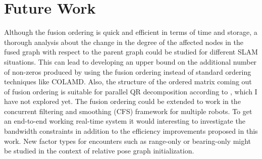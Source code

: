\section{Future Work}
Although the fusion ordering is quick and efficient in terms of time and storage, a thorough analysis about the change in the degree of the affected nodes in the fused graph with respect to the parent graph could be studied for different SLAM situations. This can lead to developing an upper bound on the additional number of non-zeros produced by using the fusion ordering instead of standard ordering techniques like COLAMD. Also, the structure of the ordered matrix coming out of fusion ordering is suitable for parallel QR decomposition according to \cite{parallelqr}, which I have not explored yet. The fusion ordering could be extended to work in the concurrent filtering and smoothing (CFS) framework \cite{cfs} for multiple robots. To get an end-to-end working real-time system it would interesting to investigate the bandwidth constraints in addition to the efficiency improvements proposed in this work. New factor types for encounters such as range-only or bearing-only might be studied in the context of relative pose graph initialization. 


